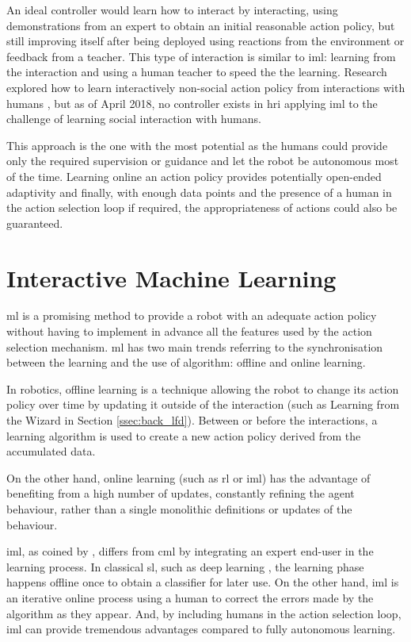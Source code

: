 	An ideal controller would learn how to interact by interacting, using demonstrations from an expert to obtain an initial reasonable action policy, but still improving itself after being deployed using reactions from the environment or feedback from a teacher. This type of interaction is similar to \gls{iml}: learning from the interaction and using a human teacher to speed the the learning. Research explored how to learn interactively non-social action policy from interactions with humans \citep{scheutz2017spoken,cakmak2010designing}, but as of April 2018, no controller exists in \gls{hri} applying \gls{iml} to the challenge of learning social interaction with humans. 

	This approach is the one with the most potential as the humans could provide only the required supervision or guidance and let the robot be autonomous most of the time. Learning online an action policy provides potentially open-ended adaptivity and finally, with enough data points and the presence of a human in the action selection loop if required, the appropriateness of actions could also be guaranteed.
	
\section{Interactive Machine Learning} \label{sec:back_iml}

\gls{ml} is a promising method to provide a robot with an adequate action policy without having to implement in advance all the features used by the action selection mechanism. \gls{ml} has two main trends referring to the synchronisation between the learning and the use of algorithm: offline and online learning.

In robotics, offline learning is a technique allowing the robot to change its action policy over time by updating it outside of the interaction (such as Learning from the Wizard in Section \ref{ssec:back_lfd}). Between or before the interactions, a learning algorithm is used to create a new action policy derived from the accumulated data.

On the other hand, online learning (such as \gls{rl} or \gls{iml}) has the advantage of benefiting from a high number of updates, constantly refining the agent behaviour, rather than a single monolithic definitions or updates of the behaviour. 

\acrfull{iml}, as coined by \cite{fails2003interactive}, differs from \acrfull{cml} by integrating an expert end-user in the learning process. In classical \gls{sl}, such as deep learning \citep{lecun2015deep}, the learning phase happens offline once to obtain a classifier for later use. On the other hand, \gls{iml} is an iterative online process using a human to correct the errors made by the algorithm as they appear. And, by including humans in the action selection loop, \gls{iml} can provide tremendous advantages compared to fully autonomous learning.

